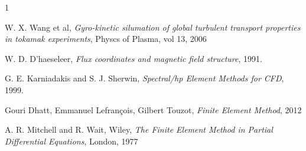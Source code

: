 \documentclass{report}
\begin{document}
\begin{thebibliography}{1}

   W. X. Wang et al, {\em Gyro-kinetic silumation of global turbulent
                transport properties in tokamak experiments},
                Physcs of  Plasma, vol 13,  2006

   W. D. D'haeseleer, {\em Flux coordinates and magnetic field structure},
                1991.

   G. E. Karniadakis and S. J. Sherwin, {\em Spectral/hp Element Methods for CFD},
                1999.

   Gouri Dhatt, Emmanuel Lefrançois, Gilbert Touzot, {\em Finite Element Method}, 2012

   A. R. Mitchell and R. Wait, Wiley, {\em The Finite Element Method in Partial Differential Equations}, London, 1977
  \end{thebibliography}
\end{document}

